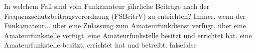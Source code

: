     {In welchem Fall sind vom Funkamateur jährliche Beiträge nach der Frequenzschutzbeitragsverordnung (FSBeitrV) zu entrichten? Immer, wenn der Funkamateur...}
    {über eine Zulassung zum Amateurfunkdienst verfügt.}
    {über eine Amateurfunkstelle verfügt.}
    {eine Amateurfunkstelle besitzt und errichtet hat.}
    {eine Amateurfunkstelle besitzt, errichtet hat und betreibt.}
    {false}{false}